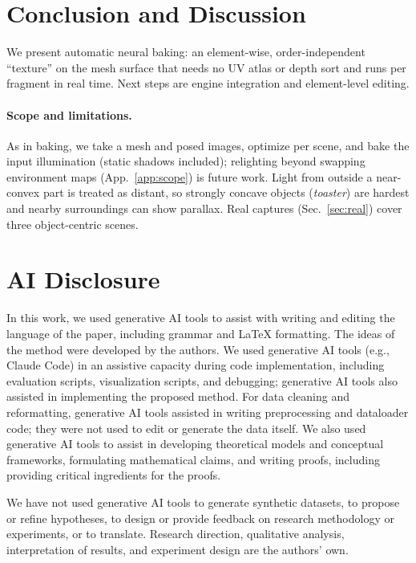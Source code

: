 \vspace{-2mm}
\section{Conclusion and Discussion}
\vspace{-2mm}
\label{sec:conclusion}
We present automatic neural baking: an element-wise, order-independent ``texture'' on the mesh
surface that needs no UV atlas or depth sort and runs per fragment in real time. Next steps are
engine integration and element-level editing.

\begin{revblock}
\paragraph{Scope and limitations.} As in baking, we take a mesh and posed images, optimize per
scene, and bake the input illumination (static shadows included); relighting beyond swapping
environment maps (App.~\ref{app:scope}) is future work. Light from outside a near-convex part is
treated as distant, so strongly concave objects (\emph{toaster}) are hardest and nearby surroundings
can show parallax. Real captures (Sec.~\ref{sec:real}) cover three object-centric scenes.
\end{revblock}

\section{AI Disclosure}
In this work, we used generative AI tools to assist with writing and editing the language of the paper, including grammar and LaTeX formatting. The ideas of the method were developed by the authors. We used generative AI tools (e.g., Claude Code) in an assistive capacity during code implementation, including evaluation scripts, visualization scripts, and debugging; generative AI tools also assisted in implementing the proposed method. For data cleaning and reformatting, generative AI tools assisted in writing preprocessing and dataloader code; they were not used to edit or generate the data itself. We also used generative AI tools to assist in developing theoretical models and conceptual frameworks, formulating mathematical claims, and writing proofs, including providing critical ingredients for the proofs.

We have not used generative AI tools to generate synthetic datasets, to propose or refine hypotheses, to design or provide feedback on research methodology or experiments, or to translate. Research direction, qualitative analysis, interpretation of results, and experiment design are the authors' own.

